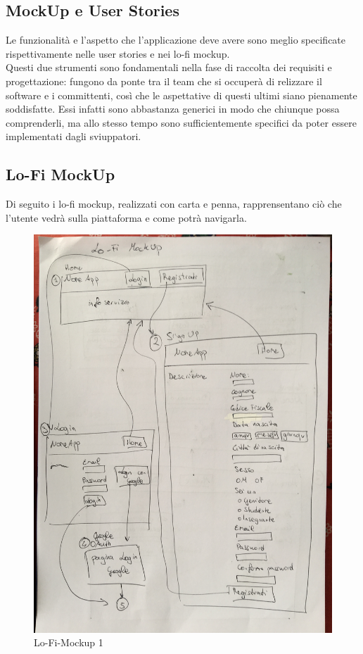 \documentclass[Lau, binding=0.6cm, oneside]{sapthesis}
\begin{document}
\subsection{MockUp e User Stories}

Le funzionalità e l'aspetto che l'applicazione deve avere sono meglio specificate rispettivamente nelle user stories e nei lo-fi mockup.\\
Questi due strumenti sono fondamentali nella fase di raccolta dei requisiti e progettazione: fungono da ponte tra il team che si occuperà di relizzare il software e i committenti, così che le aspettative di questi ultimi siano pienamente soddisfatte. Essi infatti sono abbastanza generici in modo che chiunque possa comprenderli, ma allo stesso tempo sono sufficientemente specifici da poter essere implementati dagli sviuppatori.

\newpage
\subsection{Lo-Fi MockUp}

Di seguito i lo-fi mockup, realizzati con carta e penna, rapprensentano ciò che l'utente vedrà sulla piattaforma e come potrà navigarla.\\

\begin{figure}[H]
	\centering
	\includegraphics[width=1.3\linewidth, angle=-90]{images/mockup_1}
	\caption{Lo-Fi-Mockup 1}
	\label{fig:mockup_1}
\end{figure}
\end{document}
